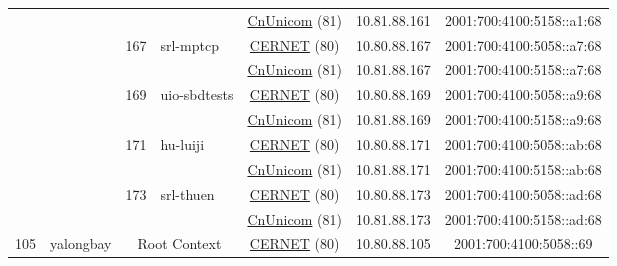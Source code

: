 \begin{small}
\begin{center}
\begin{longtable}{|c|c|c|c|c|c|c|c|}
  &  &  &  & \multicolumn{2}{|c|}{\tiny{\href{http://www.chinaunicom.com}{CnUnicom} (81)}} & \tiny{10.81.88.161} & \tiny{2001:700:4100:5158::a1:68} \\* \cline{3-3}\cline{4-4}\cline{5-5}\cline{6-6}\cline{7-7}\cline{8-8}
  &  & \multirow{2}{*}{\tiny{167}} & \multicolumn{1}{|l|}{\multirow{2}{*}{\tiny{srl-mptcp}}} & \multicolumn{2}{|c|}{\tiny{\href{http://www.cernet.edu.cn}{CERNET} (80)}} & \tiny{10.80.88.167} & \tiny{2001:700:4100:5058::a7:68} \\* \cline{5-5}\cline{6-6}\cline{7-7}\cline{8-8}
  &  &  &  & \multicolumn{2}{|c|}{\tiny{\href{http://www.chinaunicom.com}{CnUnicom} (81)}} & \tiny{10.81.88.167} & \tiny{2001:700:4100:5158::a7:68} \\* \cline{3-3}\cline{4-4}\cline{5-5}\cline{6-6}\cline{7-7}\cline{8-8}
  &  & \multirow{2}{*}{\tiny{169}} & \multicolumn{1}{|l|}{\multirow{2}{*}{\tiny{uio-sbdtests}}} & \multicolumn{2}{|c|}{\tiny{\href{http://www.cernet.edu.cn}{CERNET} (80)}} & \tiny{10.80.88.169} & \tiny{2001:700:4100:5058::a9:68} \\* \cline{5-5}\cline{6-6}\cline{7-7}\cline{8-8}
  &  &  &  & \multicolumn{2}{|c|}{\tiny{\href{http://www.chinaunicom.com}{CnUnicom} (81)}} & \tiny{10.81.88.169} & \tiny{2001:700:4100:5158::a9:68} \\* \cline{3-3}\cline{4-4}\cline{5-5}\cline{6-6}\cline{7-7}\cline{8-8}
  &  & \multirow{2}{*}{\tiny{171}} & \multicolumn{1}{|l|}{\multirow{2}{*}{\tiny{hu-luiji}}} & \multicolumn{2}{|c|}{\tiny{\href{http://www.cernet.edu.cn}{CERNET} (80)}} & \tiny{10.80.88.171} & \tiny{2001:700:4100:5058::ab:68} \\* \cline{5-5}\cline{6-6}\cline{7-7}\cline{8-8}
  &  &  &  & \multicolumn{2}{|c|}{\tiny{\href{http://www.chinaunicom.com}{CnUnicom} (81)}} & \tiny{10.81.88.171} & \tiny{2001:700:4100:5158::ab:68} \\* \cline{3-3}\cline{4-4}\cline{5-5}\cline{6-6}\cline{7-7}\cline{8-8}
  &  & \multirow{2}{*}{\tiny{173}} & \multicolumn{1}{|l|}{\multirow{2}{*}{\tiny{srl-thuen}}} & \multicolumn{2}{|c|}{\tiny{\href{http://www.cernet.edu.cn}{CERNET} (80)}} & \tiny{10.80.88.173} & \tiny{2001:700:4100:5058::ad:68} \\* \cline{5-5}\cline{6-6}\cline{7-7}\cline{8-8}
  &  &  &  & \multicolumn{2}{|c|}{\tiny{\href{http://www.chinaunicom.com}{CnUnicom} (81)}} & \tiny{10.81.88.173} & \tiny{2001:700:4100:5158::ad:68} \\ \hline
 \multirow{22}{*}{\tiny{105}} & \multicolumn{1}{|l|}{\multirow{22}{*}{\tiny{yalongbay}}} & \multicolumn{2}{|c|}{\multirow{2}{*}{\tiny{Root Context}}} & \multicolumn{2}{|c|}{\tiny{\href{http://www.cernet.edu.cn}{CERNET} (80)}} & \tiny{10.80.88.105} & \tiny{2001:700:4100:5058::69} \\* \cline{5-5}\cline{6-6}\cline{7-7}\cline{8-8}

\end{longtable}
\end{center}
\end{small}

